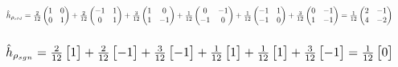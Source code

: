 \documentclass{beamer} %
\theoremstyle{definition} %
\def \pausenl {\pause $ \ $\\}
\begin{document}
\begin{frame}
\begin{columns}
\begin{column}{.8\textwidth}
	
	\begin{equation*}
	\resizebox{\textwidth}{!}{$\hat{h}_{\rho_{std}} = 
		\frac{2}{12}\begin{pmatrix} 1 & 0  \\ 0 & 1 \end{pmatrix} + 
		\frac{2}{12}\begin{pmatrix} -1 & 1  \\ 0 & 1 \end{pmatrix}  +
		\frac{3}{12}\begin{pmatrix} 1 & 0  \\ 1 & -1 \end{pmatrix} + 
		\frac{1}{12}\begin{pmatrix} 0 & -1  \\ -1 & 0 \end{pmatrix}+ 
		\frac{1}{12}\begin{pmatrix} -1 & 1  \\ -1 & 0 \end{pmatrix}  + 
		\frac{3}{12}\begin{pmatrix} 0 & -1  \\ 1 & -1 \end{pmatrix}   = 
		\frac{1}{12}\begin{pmatrix} 2 & -1  \\ 4 & -2 \end{pmatrix}$}
	\end{equation*}	
	
	\pausenl 
	
	
	\begin{equation*}
		\resizebox{\textwidth}{!}{$\hat{h}_{\rho_{sgn}} = 
			\frac{2}{12}\begin{bmatrix} 1 \end{bmatrix} + 
			\frac{2}{12}\begin{bmatrix} -1 \end{bmatrix} + 
			\frac{3}{12}\begin{bmatrix} -1 \end{bmatrix} + 
			\frac{1}{12}\begin{bmatrix} 1 \end{bmatrix} + 
			\frac{1}{12}\begin{bmatrix} 1 \end{bmatrix} + 
			\frac{3}{12}\begin{bmatrix} -1 \end{bmatrix}  = 
			\frac{1}{12}\begin{bmatrix} 0 \end{bmatrix}$}
	\end{equation*}
	
\end{column}
	\end{columns}		

	
	\end{frame}
	
\end{document}
